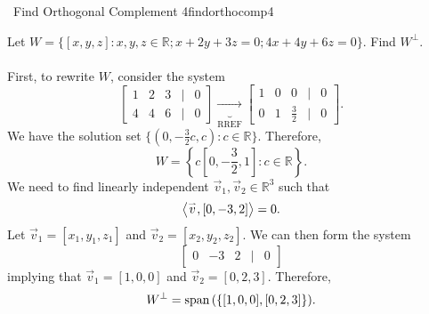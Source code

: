         \pagebreak
        \begin{example}{\Difficulty\,\Difficulty\,\,Find Orthogonal Complement 4}{findorthocomp4}

            Let \(W=\{[x,y,z]:x,y,z\in\mathbb{R};x+2y+3z=0;4x+4y+6z=0\}\). Find \(W^\perp\).
            \\
            \\
            First, to rewrite \(W\), consider the system
            \begin{equation*}
                \begin{bmatrix}
                    1 & 2 & 3 & | & 0 \\
                    4 & 4 & 6 & | & 0
                \end{bmatrix}\underbrace{\to}_\text{RREF}
                \begin{bmatrix}
                    1 & 0 & 0 & | & 0 \\
                    0 & 1 & \frac{3}{2} & | & 0
                \end{bmatrix}.
            \end{equation*}
            We have the solution set \(\{(0,-\frac{3}{2}c,c):c\in\mathbb{R}\}\). Therefore,
            \begin{equation*}
                W=\left\{c\left[0,-\frac{3}{2},1\right]:c\in\mathbb{R}\right\}.
            \end{equation*}
            We need to find linearly independent \(\vec{v}_1,\vec{v}_2\in\mathbb{R}^3\) such that
            \begin{equation*}
                \left\langle \overset{_{\rightharpoonup}}{v},[0,-3,2]\right\rangle=0.
            \end{equation*}
            Let \(\vec{v}_1=[x_1,y_1,z_1]\) and \(\vec{v}_2=[x_2,y_2,z_2]\). We can then form the system
            \begin{equation*}
                \begin{bmatrix}
                    0 & -3 & 2 & | & 0
                \end{bmatrix}
            \end{equation*}
            implying that \(\vec{v}_1=[1,0,0]\) and \(\vec{v}_2=[0,2,3]\). Therefore,
            \begin{equation*}
                W^\perp=\text{span\,}(\{[1,0,0],[0,2,3]\}).
            \end{equation*}
        \end{example}
        \pagebreak
        \vphantom
        \\
        \\
